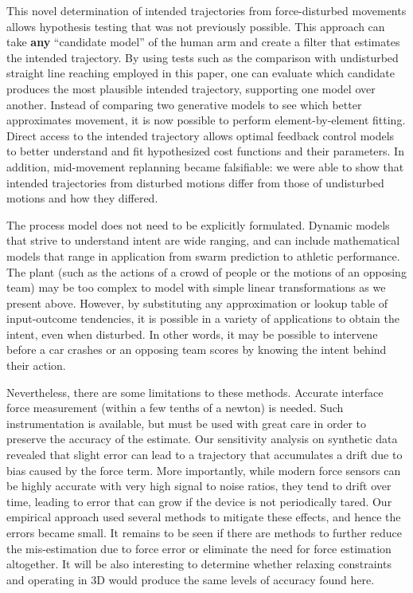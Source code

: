This novel determination of intended trajectories from force-disturbed movements allows hypothesis testing that was not previously possible. This approach can take \textbf{any} ``candidate model'' of the human arm and create a filter that estimates the intended trajectory. By using tests such as the comparison with undisturbed straight line reaching employed in this paper, one can evaluate which candidate produces the most plausible intended trajectory, supporting one model over another.  Instead of comparing two generative models to see which better approximates movement, it is now possible to perform element-by-element fitting. Direct access to the intended trajectory allows optimal feedback control models to better understand and fit hypothesized cost functions and their parameters. In addition, mid-movement replanning became falsifiable: we were able to show that intended trajectories from disturbed motions differ from those of undisturbed motions and how they differed.

The process model does not need to be explicitly formulated. Dynamic models that strive to understand intent are wide ranging, and can include mathematical models that range in application from swarm prediction to athletic performance. The plant (such as the actions of a crowd of people or the motions of an opposing team) may be too complex to model with simple linear transformations as we present above. However, by substituting any approximation or lookup table of input-outcome tendencies, it is possible in a variety of applications to obtain the intent, even when disturbed. In other words, it may be possible to intervene before a car crashes or an opposing team scores by knowing the intent behind their action.

Nevertheless, there are some limitations to these methods. Accurate interface force measurement (within a few tenths of a newton) is needed. Such instrumentation is available, but must be used with great care in order to preserve the accuracy of the estimate. Our sensitivity analysis on synthetic data revealed that slight error can lead to a trajectory that accumulates a drift due to bias caused by the force term. More importantly, while modern force sensors can be highly accurate with very high signal to noise ratios, they tend to drift over time, leading to error that can grow if the device is not periodically tared. Our empirical approach used several methods to mitigate these effects, and hence the errors became small. It remains to be seen if there are methods to further reduce the mis-estimation due to force error or eliminate the need for force estimation altogether. It will be also interesting to determine whether relaxing constraints and operating in 3D would produce the same levels of accuracy found here.



